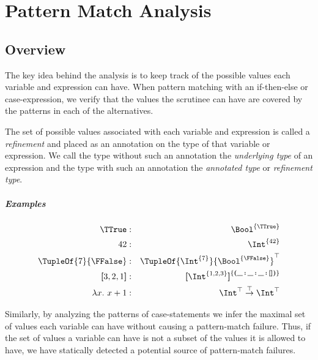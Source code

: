 
\chapter{Pattern Match Analysis}\label{chappma}

\section{Overview}

The key idea behind the analysis is to keep track of the possible values each variable and expression can have. When pattern matching with an if-then-else or case-expression, we verify that the values the scrutinee can have are covered by the patterns in each of the alternatives.

The set of possible values associated with each variable and expression is called a \emph{refinement} and placed as an annotation on the type of that variable or expression. We call the type without such an annotation the \emph{underlying type} of an expression and the type with such an annotation the \emph{annotated type} or \emph{refinement type}.

\paragraph{Examples}
\begin{eqnarray}
\TTrue &:& \Bool^{\{\TTrue\}} \\
42 &:& \Int^{\{42\}} \\
\TupleOf{7}{\FFalse} &:& \TupleOf{\Int^{\{7\}}}{\Bool^{\{\FFalse\}}}^\top \\
\textbf{[}3,2,1\textbf{]} &:& \textbf{[}\Int^{\{1,2,3\}}\textbf{]}^{\{\textbf{(\_\,:\,\_\,:\,\_\,:\,[])}\}} \\
\lambda x.\ x + 1 &:& \Int^\top \overset{\top}{\to} \Int^\top
\end{eqnarray}

Similarly, by analyzing the patterns of case-statements we infer the maximal set of values each variable can have without causing a pattern-match failure. Thus, if the set of values a variable can have is not a subset of the values it is allowed to have, we have statically detected a potential source of pattern-match failures.

